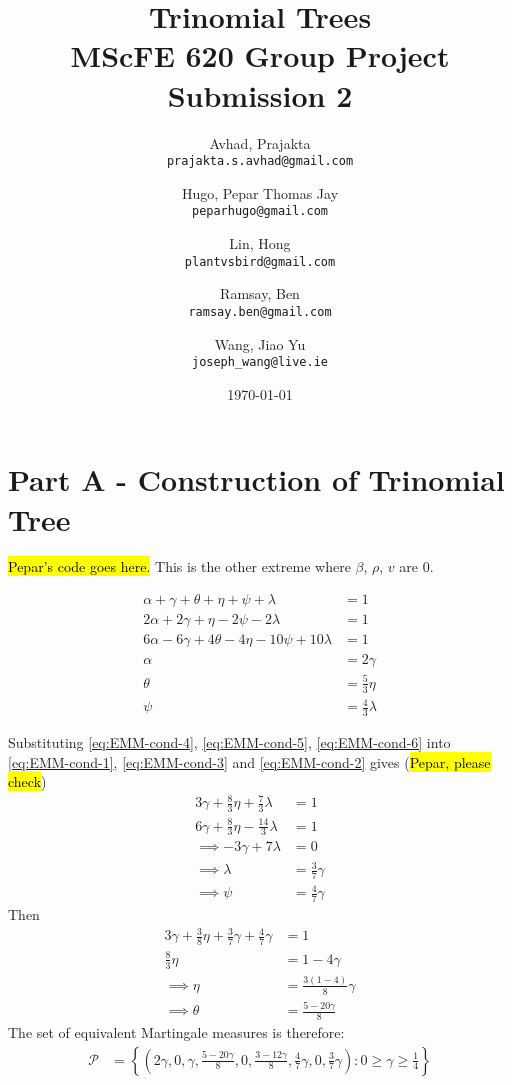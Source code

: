 \documentclass{article}
\title{Trinomial Trees \\ MScFE 620 Group Project Submission 2}
\date{\today}
\author{
  Avhad, Prajakta\\
  \texttt{prajakta.s.avhad@gmail.com}
  \and
  Hugo, Pepar Thomas Jay\\
  \texttt{peparhugo@gmail.com}
  \and
  Lin, Hong\\
  \texttt{plantvsbird@gmail.com}
  \and
  Ramsay, Ben\\
  \texttt{ramsay.ben@gmail.com}
  \and
  Wang, Jiao Yu\\
  \texttt{joseph\_wang@live.ie}
}
\begin{document}
\maketitle  


\section{Part A - Construction of Trinomial Tree}

\hl{Pepar's code goes here.}
This is the other extreme where $\beta$, $\rho$, $v$ are 0. 

\begin{align}
    \alpha+\gamma+\theta+\eta+\psi+\lambda & = 1 \label{eq:EMM-cond-1} \\
    2\alpha+2\gamma + \eta - 2\psi - 2\lambda & = 1 \label{eq:EMM-cond-2}\\
    6\alpha - 6\gamma + 4\theta -4\eta -10\psi + 10\lambda & = 1 \label{eq:EMM-cond-3}\\
    \alpha & = 2\gamma \label{eq:EMM-cond-4}\\
    \theta & = \frac{5}{3}\eta \label{eq:EMM-cond-5}\\
    \psi & = \frac{4}{3}\lambda \label{eq:EMM-cond-6}
\end{align}

Substituting \ref{eq:EMM-cond-4}, \ref{eq:EMM-cond-5}, \ref{eq:EMM-cond-6} into \ref{eq:EMM-cond-1}, \ref{eq:EMM-cond-3} and \ref{eq:EMM-cond-2} gives (\hl{Pepar, please check})
\begin{align*}
    3\gamma + \frac{8}{3}\eta + \frac{7}{3}\lambda & = 1 \\
    6\gamma + \frac{8}{3}\eta - \frac{14}{3}\lambda & = 1 \\
    \implies -3\gamma + 7\lambda & = 0 \\
    \implies \lambda & = \frac{3}{7}\gamma \\
    \implies \psi & = \frac{4}{7}\gamma
\end{align*}
Then
\begin{align*}
    3\gamma+\frac{3}{8}\eta + \frac{3}{7}\gamma + \frac{4}{7}\gamma & = 1 \\
    \frac{8}{3}\eta & = 1 - 4\gamma \\
    \implies \eta & = \frac{3(1-4)}{8}\gamma \\
    \implies \theta & = \frac{5-20\gamma}{8}
\end{align*}
The set of equivalent Martingale measures is therefore:
\begin{align*}
    \mathcal{P} & =\left\{ \left(2\gamma,0,\gamma,\frac{5-20\gamma}{8},0,\frac{3-12\gamma}{8},\frac{4}{7}\gamma,0,\frac{3}{7}\gamma\right): 0\ge\gamma\ge\frac{1}{4}\right\}
\end{align*}
\end{document}
